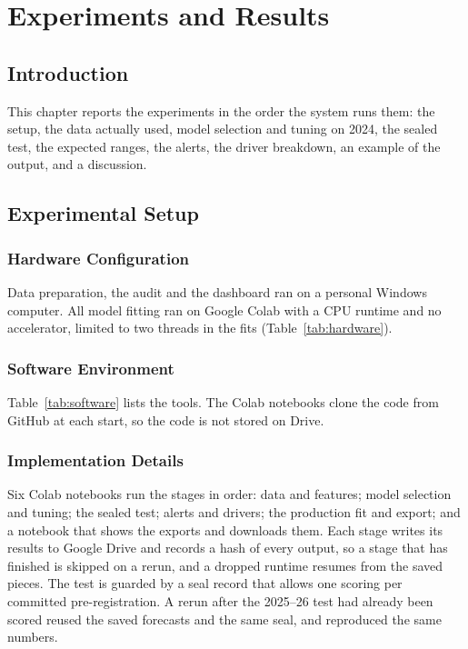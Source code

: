 \chapter{Experiments and Results}

\section{Introduction}
This chapter reports the experiments in the order the system runs them: the setup, the data actually used, model selection and tuning on 2024, the sealed test, the expected ranges, the alerts, the driver breakdown, an example of the output, and a discussion.

\section{Experimental Setup}

\subsection{Hardware Configuration}
Data preparation, the audit and the dashboard ran on a personal Windows computer. All model fitting ran on Google Colab with a CPU runtime and no accelerator, limited to two threads in the fits (Table~\ref{tab:hardware}).

\begin{table}[H]\centering\small
\caption[Hardware configuration]{Hardware configuration.}\label{tab:hardware}

\end{table}

\subsection{Software Environment}
Table~\ref{tab:software} lists the tools. The Colab notebooks clone the code from GitHub at each start, so the code is not stored on Drive.

\begin{table}[H]\centering\small
\caption[Software environment]{Software environment.}\label{tab:software}

\end{table}

\subsection{Implementation Details}
Six Colab notebooks run the stages in order: data and features; model selection and tuning; the sealed test; alerts and drivers; the production fit and export; and a notebook that shows the exports and downloads them. Each stage writes its results to Google Drive and records a hash of every output, so a stage that has finished is skipped on a rerun, and a dropped runtime resumes from the saved pieces. The test is guarded by a seal record that allows one scoring per committed pre-registration. A rerun after the 2025--26 test had already been scored reused the saved forecasts and the same seal, and reproduced the same numbers.

